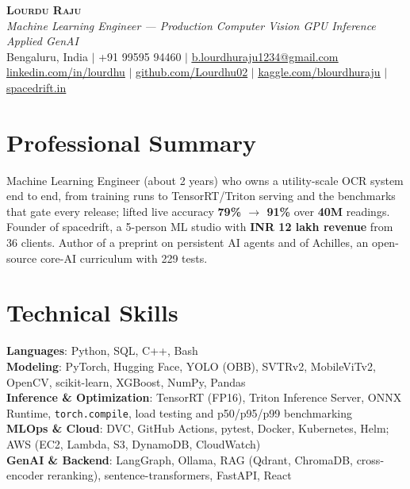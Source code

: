 \documentclass[letterpaper,11pt]{article}
\begin{document}
\begin{center}
    \textbf{\Huge \scshape Lourdu Raju} \\ \vspace{3pt}
    \small \textit{Machine Learning Engineer --- Production Computer Vision \textbar{} GPU Inference \textbar{} Applied GenAI} \\ \vspace{4pt}
    \small Bengaluru, India $|$ +91 99595 94460 $|$
    \href{mailto:b.lourdhuraju1234@gmail.com}{\underline{b.lourdhuraju1234@gmail.com}} \\ \vspace{1pt}
    \small \href{https://linkedin.com/in/lourdhu}{\underline{linkedin.com/in/lourdhu}} $|$
    \href{https://github.com/Lourdhu02}{\underline{github.com/Lourdhu02}} $|$
    \href{https://kaggle.com/blourdhuraju}{\underline{kaggle.com/blourdhuraju}} $|$
    \href{https://spacedrift.in}{\underline{spacedrift.in}}
\end{center}

\section{Professional Summary}
Machine Learning Engineer (about 2 years) who owns a utility-scale OCR system end to end, from training runs to TensorRT/Triton serving and the benchmarks that gate every release; lifted live accuracy \textbf{79\% $\rightarrow$ 91\%} over \textbf{40M} readings. Founder of spacedrift, a 5-person ML studio with \textbf{INR 12 lakh revenue} from 36 clients. Author of a preprint on persistent AI agents and of Achilles, an open-source core-AI curriculum with 229 tests.

\section{Technical Skills}
\begin{itemize}[leftmargin=0.15in, label={}]
  \small{\item{
    \textbf{Languages}: Python, SQL, C++, Bash \\
    \textbf{Modeling}: PyTorch, Hugging Face, YOLO (OBB), SVTRv2, MobileViTv2, OpenCV, scikit-learn, XGBoost, NumPy, Pandas \\
    \textbf{Inference \& Optimization}: TensorRT (FP16), Triton Inference Server, ONNX Runtime, \texttt{torch.compile}, load testing and p50/p95/p99 benchmarking \\
    \textbf{MLOps \& Cloud}: DVC, GitHub Actions, pytest, Docker, Kubernetes, Helm; AWS (EC2, Lambda, S3, DynamoDB, CloudWatch) \\
    \textbf{GenAI \& Backend}: LangGraph, Ollama, RAG (Qdrant, ChromaDB, cross-encoder reranking), sentence-transformers, FastAPI, React
  }}
\end{itemize}
\end{document}
